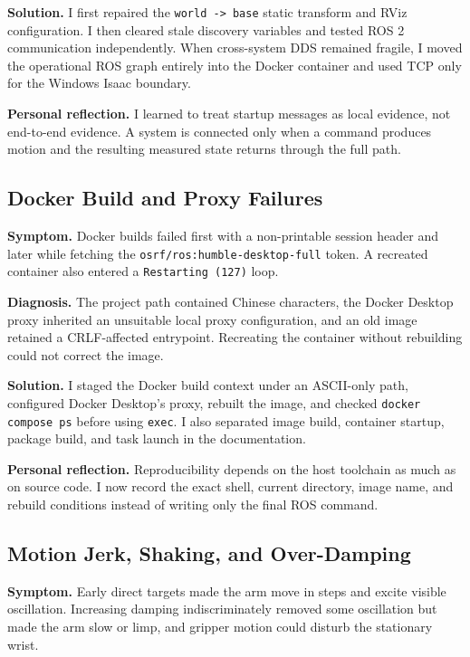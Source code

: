 \documentclass[UTF8,zihao=-4,scheme=chinese,fontset=none]{ctexart}
\begin{document}
\textbf{Solution.} I first repaired the \texttt{world -> base} static transform and RViz configuration. I then cleared stale discovery variables and tested ROS 2 communication independently. When cross-system DDS remained fragile, I moved the operational ROS graph entirely into the Docker container and used TCP only for the Windows Isaac boundary.

\textbf{Personal reflection.} I learned to treat startup messages as local evidence, not end-to-end evidence. A system is connected only when a command produces motion and the resulting measured state returns through the full path.

\subsection{Docker Build and Proxy Failures}

\textbf{Symptom.} Docker builds failed first with a non-printable session header and later while fetching the \texttt{osrf/ros:humble-desktop-full} token. A recreated container also entered a \texttt{Restarting (127)} loop.

\textbf{Diagnosis.} The project path contained Chinese characters, the Docker Desktop proxy inherited an unsuitable local proxy configuration, and an old image retained a CRLF-affected entrypoint. Recreating the container without rebuilding could not correct the image.

\textbf{Solution.} I staged the Docker build context under an ASCII-only path, configured Docker Desktop's proxy, rebuilt the image, and checked \texttt{docker compose ps} before using \texttt{exec}. I also separated image build, container startup, package build, and task launch in the documentation.

\textbf{Personal reflection.} Reproducibility depends on the host toolchain as much as on source code. I now record the exact shell, current directory, image name, and rebuild conditions instead of writing only the final ROS command.

\subsection{Motion Jerk, Shaking, and Over-Damping}

\textbf{Symptom.} Early direct targets made the arm move in steps and excite visible oscillation. Increasing damping indiscriminately removed some oscillation but made the arm slow or limp, and gripper motion could disturb the stationary wrist.
\end{document}
